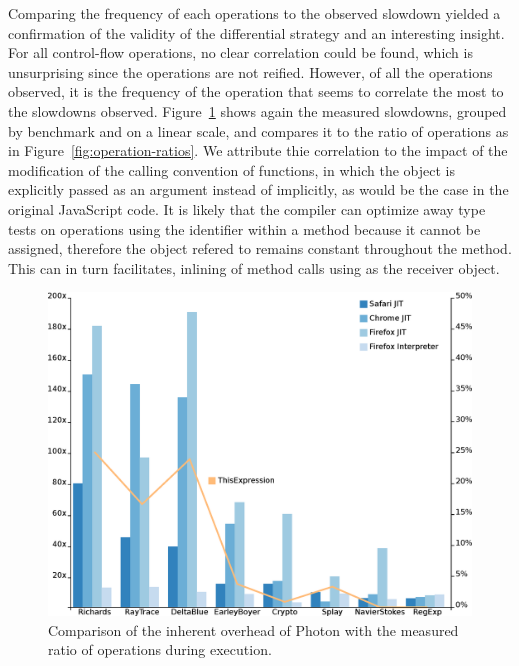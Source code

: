 Comparing the frequency of each operations to the observed slowdown yielded a
confirmation of the validity of the differential strategy and an interesting
insight. For all control-flow operations, no clear correlation could be found,
which is unsurprising since the operations are not reified. However, of all the
operations observed, it is the frequency of the  operation that seems
to correlate the most to the slowdowns observed.
Figure~\ref{fig:slowdown-vs-this-ratio} shows again the measured slowdowns,
grouped by benchmark and on a linear scale, and compares it to the ratio of
 operations as in Figure~\ref{fig:operation-ratios}.  We attribute
thie correlation to the impact of the modification of the calling convention of
functions, in which the  object is explicitly passed as an argument
instead of implicitly, as would be the case in the original JavaScript code. It
is likely that the compiler can optimize away type tests on operations using
the  identifier within a method because it cannot be assigned,
therefore the object refered to remains constant throughout the method. This
can in turn facilitates, inlining of method calls using  as the
receiver object.

\begin{figure}[htbp]
\begin{center}
\includegraphics[width=.80\textwidth]{figures/slowdownVSThisRatio}
\caption[Slowdown and ratio of  operations]{Comparison of the inherent overhead of Photon with the measured ratio of  operations during execution.}
\label{fig:slowdown-vs-this-ratio}
\end{center}
\end{figure}

\FloatBarrier

